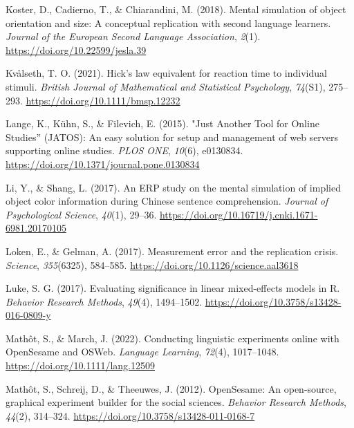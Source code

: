 \documentclass[
  man]{apa7}
\newlength{\cslhangindent}
\newlength{\cslentryspacingunit} %
\newenvironment{CSLReferences}[2] %
 {%
  \setlength{\parindent}{0pt}
  \ifodd #1
  \let\oldpar\par
  \def\par{\hangindent=\cslhangindent\oldpar}
  \fi
  \setlength{\parskip}{#2\cslentryspacingunit}
 }%
 {}
\begin{document}
\begin{CSLReferences}{1}{0}
\leavevmode{}%
Koster, D., Cadierno, T., \& Chiarandini, M. (2018). Mental simulation of object orientation and size: {A} conceptual replication with second language learners. \emph{Journal of the European Second Language Association}, \emph{2}(1). \url{https://doi.org/10.22599/jesla.39}

\leavevmode{}%
Kvålseth, T. O. (2021). Hick's law equivalent for reaction time to individual stimuli. \emph{British Journal of Mathematical and Statistical Psychology}, \emph{74}(S1), 275--293. \url{https://doi.org/10.1111/bmsp.12232}

\leavevmode{}%
Lange, K., Kühn, S., \& Filevich, E. (2015). "{Just Another Tool} for {Online Studies}'' ({JATOS}): {An} easy solution for setup and management of web servers supporting online studies. \emph{PLOS ONE}, \emph{10}(6), e0130834. \url{https://doi.org/10.1371/journal.pone.0130834}

\leavevmode{}%
Li, Y., \& Shang, L. (2017). {An ERP study on the mental simulation of implied object color information during Chinese sentence comprehension}. \emph{Journal of Psychological Science}, \emph{40}(1), 29--36. \url{https://doi.org/10.16719/j.cnki.1671-6981.20170105}

\leavevmode{}%
Loken, E., \& Gelman, A. (2017). Measurement error and the replication crisis. \emph{Science}, \emph{355}(6325), 584--585. \url{https://doi.org/10.1126/science.aal3618}

\leavevmode{}%
Luke, S. G. (2017). Evaluating significance in linear mixed-effects models in {R}. \emph{Behavior Research Methods}, \emph{49}(4), 1494--1502. \url{https://doi.org/10.3758/s13428-016-0809-y}

\leavevmode{}%
Mathôt, S., \& March, J. (2022). Conducting {linguistic} {experiments} {online} {with} {OpenSesame} and {OSWeb}. \emph{Language Learning}, \emph{72}(4), 1017--1048. \url{https://doi.org/10.1111/lang.12509}

\leavevmode{}%
Mathôt, S., Schreij, D., \& Theeuwes, J. (2012). {OpenSesame}: {An} open-source, graphical experiment builder for the social sciences. \emph{Behavior Research Methods}, \emph{44}(2), 314--324. \url{https://doi.org/10.3758/s13428-011-0168-7}


\end{CSLReferences}
\end{document}
